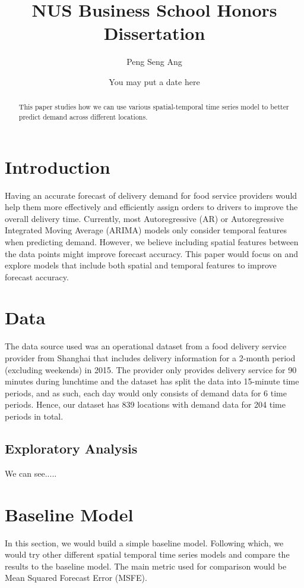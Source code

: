 \documentclass[10pt, letterpaper] {article}
\begin{document}
	\title{NUS Business School Honors Dissertation}
	\author{Peng Seng Ang}
	\date{You may put a date here}
	\maketitle
\begin{abstract}
This paper studies how we can use various spatial-temporal time series model to better predict demand across different locations. 
\end{abstract}
\section{Introduction}
Having an accurate forecast of delivery demand for food service providers would help them more effectively and efficiently assign orders to drivers to improve the overall delivery time. Currently, most Autoregressive (AR) or Autoregressive Integrated Moving Average (ARIMA) models only consider temporal features when predicting demand. However, we believe including spatial features between the data points might improve forecast accuracy. This paper would focus on and explore models that include both spatial and temporal features to improve forecast accuracy. 
\section{Data}
The data source used was an operational dataset from a food delivery service provider from Shanghai that includes delivery information for a 2-month period (excluding weekends) in 2015. The provider only provides delivery service for 90 minutes during lunchtime and the dataset has split the data into 15-minute time periods, and as such, each day would only consists of demand data for 6 time periods. Hence, our dataset has 839 locations with demand data for 204 time periods in total. 

\subsection{Exploratory Analysis}
We can see.....
\section{Baseline Model}
In this section, we would build a simple baseline model. Following which, we would try other different spatial temporal time series models and compare the results to the baseline model. The main metric used for comparison would be Mean Squared Forecast Error (MSFE). 
\end{document}

